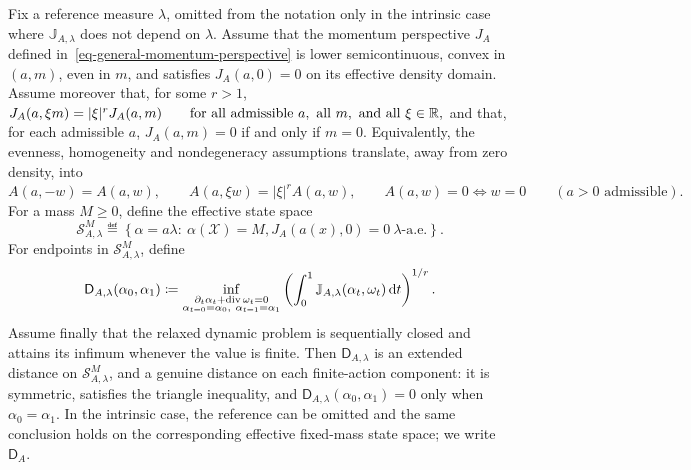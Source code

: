 \begin{prop}\label{prop-homogeneous-dynamic-action-distance}
Fix a reference measure \(\lambda\), omitted from the notation only in the intrinsic case where \(\mathbb J_{A,\lambda}\) does not depend on \(\lambda\). Assume that the momentum perspective \(J_A\) defined in~\eqref{eq-general-momentum-perspective} is lower semicontinuous, convex in \((a,m)\), even in \(m\), and satisfies \(J_A(a,0)=0\) on its effective density domain. Assume moreover that, for some \(r>1\),
\(J_A(a,\xi m)=|\xi|^rJ_A(a,m) \qquad \text{for all admissible }a,\ \text{all }m,\ \text{and all }\xi\in\mathbb{R},\)
and that, for each admissible $a$, \(J_A(a,m)=0\) if and only if \(m=0\). Equivalently, the evenness, homogeneity and nondegeneracy assumptions translate, away from zero density, into
\(A(a,-w)=A(a,w), \qquad A(a,\xi w)=|\xi|^rA(a,w), \qquad A(a,w)=0 \Longleftrightarrow w=0 \qquad (a>0\text{ admissible}).\)
For a mass $M\geq0$, define the effective state space
\[
\mathcal S_{A,\lambda}^M
\eqdef
\left\{\alpha=a\lambda:\ \alpha(\mathcal X)=M,
J_A(a(x),0)=0\ \lambda\text{-a.e.}\right\}.
\]
For endpoints in $\mathcal S_{A,\lambda}^M$, define
\[
\mathsf D_{A,\lambda}(\alpha_0,\alpha_1)
\coloneqq
\inf_{\substack{\partial_t\alpha_t+\operatorname{div}\omega_t=0\\
\alpha_{t=0}=\alpha_0,\ \alpha_{t=1}=\alpha_1}}
\left(
\int_0^1\mathbb J_{A,\lambda}(\alpha_t,\omega_t)\,\mathrm{d} t
\right)^{1/r}.
\]
Assume finally that the relaxed dynamic problem is sequentially closed and attains its infimum whenever the value is finite. Then \(\mathsf D_{A,\lambda}\) is an extended distance on $\mathcal S_{A,\lambda}^M$, and a genuine distance on each finite-action component: it is symmetric, satisfies the triangle inequality, and \(\mathsf D_{A,\lambda}(\alpha_0,\alpha_1)=0\) only when \(\alpha_0=\alpha_1\). In the intrinsic case, the reference can be omitted and the same conclusion holds on the corresponding effective fixed-mass state space; we write \(\mathsf D_A\).
\end{prop}
